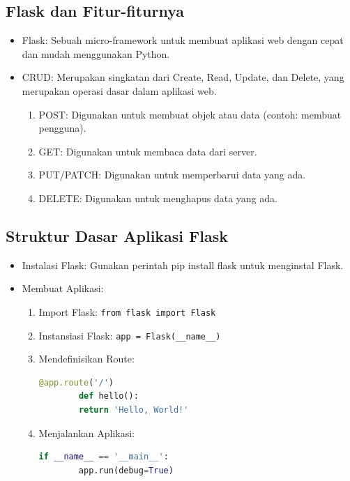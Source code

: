 \documentclass{article}
\begin{document}
\subsection{Flask dan Fitur-fiturnya}
\begin{itemize}
    \item Flask: Sebuah micro-framework untuk membuat aplikasi web dengan cepat dan mudah menggunakan Python.
    \item CRUD: Merupakan singkatan dari Create, Read, Update, dan Delete, yang merupakan operasi dasar dalam aplikasi web.
          \begin{enumerate}
              \item POST: Digunakan untuk membuat objek atau data (contoh: membuat pengguna).
              \item GET: Digunakan untuk membaca data dari server.
              \item PUT/PATCH: Digunakan untuk memperbarui data yang ada.
              \item DELETE: Digunakan untuk menghapus data yang ada.
          \end{enumerate}
\end{itemize}

\subsection{Struktur Dasar Aplikasi Flask}
\begin{itemize}
    \item  Instalasi Flask: Gunakan perintah pip install flask untuk menginstal Flask.
    \item Membuat Aplikasi:
          \begin{enumerate}
              \item Import Flask: \verb|from flask import Flask|
              \item Instansiasi Flask: \verb|app = Flask(__name__)|
              \item Mendefinisikan Route:
                    \begin{lstlisting}[language=Python, caption={}, captionpos=b]
        @app.route('/')
        def hello():
        return 'Hello, World!'
    \end{lstlisting}
              \item Menjalankan Aplikasi:
                    \begin{lstlisting}[language=Python, caption={}, captionpos=b]
        if __name__ == '__main__':
        app.run(debug=True)
    \end{lstlisting}
          \end{enumerate}
\end{itemize}
\end{document}
